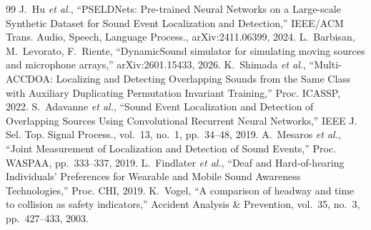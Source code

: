\documentclass[a4j,twocolumn]{jarticle}
\begin{document}
\begin{thebibliography}{99}\footnotesize
\setlength{\itemsep}{0pt}
 J.~Hu \textit{et al.}, ``PSELDNets: Pre-trained Neural
  Networks on a Large-scale Synthetic Dataset for Sound Event Localization
  and Detection,'' IEEE/ACM Trans. Audio, Speech, Language Process.,
  arXiv:2411.06399, 2024.
 L.~Barbisan, M.~Levorato, F.~Riente, ``DynamicSound
  simulator for simulating moving sources and microphone arrays,''
  arXiv:2601.15433, 2026.
 K.~Shimada \textit{et al.}, ``Multi-ACCDOA: Localizing and
  Detecting Overlapping Sounds from the Same Class with Auxiliary
  Duplicating Permutation Invariant Training,'' Proc. ICASSP, 2022.
 S.~Adavanne \textit{et al.}, ``Sound Event Localization
  and Detection of Overlapping Sources Using Convolutional Recurrent Neural
  Networks,'' IEEE J. Sel. Top. Signal Process., vol.~13, no.~1,
  pp.~34--48, 2019.
 A.~Mesaros \textit{et al.}, ``Joint Measurement of
  Localization and Detection of Sound Events,'' Proc. WASPAA,
  pp.~333--337, 2019.
 L.~Findlater \textit{et al.}, ``Deaf and Hard-of-hearing
  Individuals' Preferences for Wearable and Mobile Sound Awareness
  Technologies,'' Proc. CHI, 2019.
 K.~Vogel, ``A comparison of headway and time to collision as
  safety indicators,'' Accident Analysis \& Prevention, vol.~35, no.~3,
  pp.~427--433, 2003.
\end{thebibliography}
\end{document}
